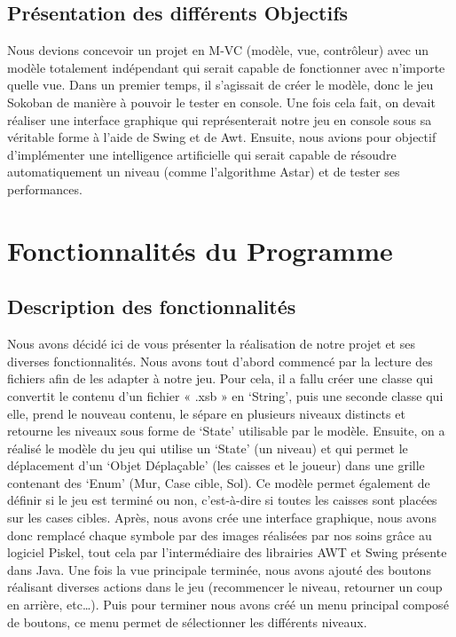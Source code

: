 \documentclass[a4paper,12pt]{article} %
\begin{document}
\subsection{Présentation des différents Objectifs}
Nous devions concevoir un projet en M-VC (modèle, vue, contrôleur) avec un modèle totalement indépendant qui serait capable de fonctionner avec n’importe quelle vue. Dans un premier temps, il s’agissait de créer le modèle, donc le jeu Sokoban de manière à pouvoir le tester en console. Une fois cela fait, on devait réaliser une interface graphique qui représenterait notre jeu en console sous sa véritable forme à l’aide de Swing et de Awt. Ensuite, nous avions pour objectif d’implémenter une intelligence artificielle qui serait capable de résoudre automatiquement un niveau (comme l’algorithme Astar) et de tester ses performances.
\section{Fonctionnalités du Programme}

\subsection{Description des fonctionnalités}
Nous avons décidé ici de vous présenter la réalisation de notre projet et ses diverses fonctionnalités.
Nous avons tout d’abord commencé par la lecture des fichiers afin de les adapter à notre jeu. Pour cela, il a fallu créer une classe qui convertit le contenu d’un fichier « .xsb » en ‘String’, puis une seconde classe qui elle, prend le nouveau contenu, le sépare en plusieurs niveaux distincts et retourne les niveaux sous forme de ‘State’ utilisable par le modèle.
Ensuite, on a réalisé le modèle du jeu qui utilise un ‘State’ (un niveau) et qui permet le déplacement d'un ‘Objet Déplaçable’ (les caisses et le joueur) dans une grille contenant des ‘Enum’ (Mur, Case cible, Sol). Ce modèle permet également de définir si le jeu est terminé ou non, c’est-à-dire si toutes les caisses sont placées sur les cases cibles.
Après, nous avons crée une interface graphique, nous avons donc remplacé chaque symbole par des images réalisées par nos soins grâce au logiciel Piskel, tout cela par l'intermédiaire des librairies AWT et Swing présente dans Java.
Une fois la vue principale terminée, nous avons ajouté des boutons réalisant diverses actions dans le jeu (recommencer le niveau, retourner un coup en arrière, etc…). Puis pour terminer nous avons créé un menu principal composé de boutons, ce menu permet de sélectionner les différents niveaux.
\end{document}
